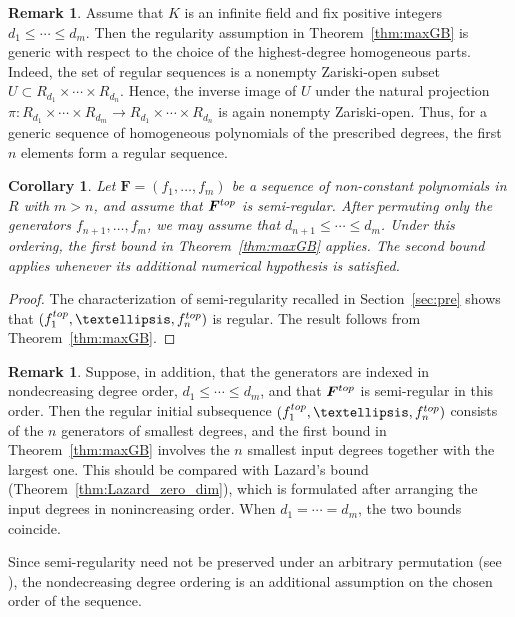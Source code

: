 \documentclass{article}
\newtheorem{corollary}[theorem]{Corollary}
\theoremstyle{definition}
\newtheorem{remark}[theorem]{Remark}
\theoremstyle{plain}
\theoremstyle{plain}
\theoremstyle{plain}
\theoremstyle{plain}
\numberwithin{equation}{subsection}
\begin{document}
\begin{remark}
Assume that $K$ is an infinite field and fix positive integers $d_1\leq\cdots\leq d_m$.
Then the regularity assumption in Theorem~\ref{thm:maxGB} is generic with respect to the choice of the highest-degree homogeneous parts.
Indeed, the set of regular sequences is a nonempty Zariski-open
subset $U\subset R_{d_1}\times\cdots\times R_{d_n}$.
Hence, the inverse image of $U$ under the natural projection $\pi:R_{d_1}\times\cdots\times R_{d_m}\longrightarrow R_{d_1}\times\cdots\times R_{d_n}$ is again nonempty Zariski-open.
Thus, for a generic sequence of homogeneous polynomials of the prescribed degrees, the first $n$ elements form a regular sequence.
\end{remark}

\begin{corollary}
Let $\bm F=(f_1,\ldots,f_m)$ be a sequence of non-constant polynomials in $R$ with $m>n$, and assume that $\bm F^{\rm top}$ is semi-regular.
After permuting only the generators $f_{n+1},\ldots,f_m$, we may assume that $d_{n+1}\leq\cdots\leq d_m$.
Under this ordering, the first bound in Theorem~\ref{thm:maxGB} applies.
The second bound applies whenever its additional numerical hypothesis is satisfied.
\end{corollary}

\begin{proof}
The characterization of semi-regularity recalled in Section~\ref{sec:pre} shows that $(f_1^{\rm top},\ldots,f_n^{\rm top})$ is regular.
The result follows from Theorem~\ref{thm:maxGB}.
\end{proof}

\begin{remark}
Suppose, in addition, that the generators are indexed in
nondecreasing degree order, $d_1\leq\cdots\leq d_m$, and that $\bm F^{\rm top}$ is semi-regular in this order.
Then the regular initial subsequence $(f_1^{\rm top},\ldots,f_n^{\rm top})$ consists of the $n$ generators of smallest degrees, and the first bound in Theorem~\ref{thm:maxGB} involves the $n$ smallest input degrees together with the largest one.
This should be compared with Lazard's bound (Theorem~\ref{thm:Lazard_zero_dim}), which is formulated after arranging the input degrees in nonincreasing order.
When $d_1=\cdots=d_m$, the two bounds coincide.

Since semi-regularity need not be preserved under an arbitrary
permutation (see \cite[p.~582]{Pardue}), the nondecreasing degree ordering is an additional assumption on the chosen order of the sequence.
\end{remark}
\end{document}
